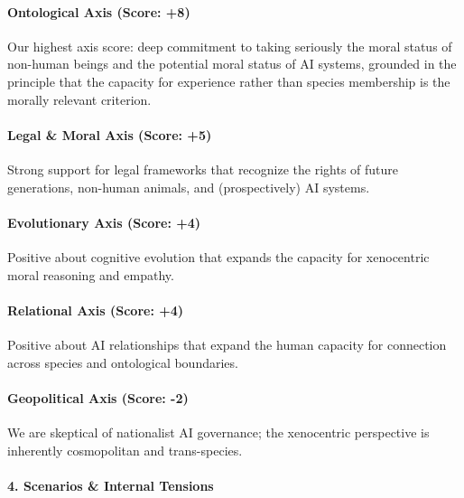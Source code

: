 \paragraph{Ontological Axis (Score:
+8)}\label{ontological-axis-score-8-1}

Our highest axis score: deep commitment to taking seriously the moral
status of non-human beings and the potential moral status of AI systems,
grounded in the principle that the capacity for experience rather than
species membership is the morally relevant criterion.

\paragraph{Legal \& Moral Axis (Score:
+5)}\label{legal-moral-axis-score-5-6}

Strong support for legal frameworks that recognize the rights of future
generations, non-human animals, and (prospectively) AI systems.

\paragraph{Evolutionary Axis (Score:
+4)}\label{evolutionary-axis-score-4-1}

Positive about cognitive evolution that expands the capacity for
xenocentric moral reasoning and empathy.

\paragraph{Relational Axis (Score: +4)}\label{relational-axis-score-4-2}

Positive about AI relationships that expand the human capacity for
connection across species and ontological boundaries.

\paragraph{Geopolitical Axis (Score:
-2)}\label{geopolitical-axis-score--2-1}

We are skeptical of nationalist AI governance; the xenocentric
perspective is inherently cosmopolitan and trans-species.

\paragraph{4. Scenarios \& Internal
Tensions}\label{scenarios-internal-tensions-36}

